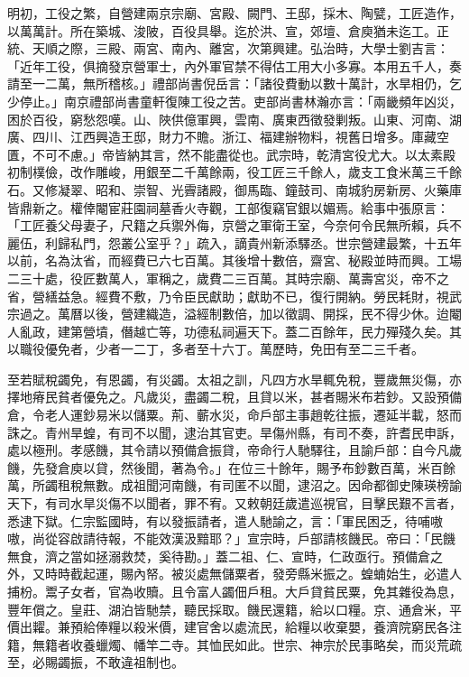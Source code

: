 明初，工役之繁，自營建兩京宗廟、宮殿、闕門、王邸，採木、陶甓，工匠造作，以萬萬計。所在築城、浚陂，百役具舉。迄於洪、宣，郊壇、倉庾猶未迄工。正統、天順之際，三殿、兩宮、南內、離宮，次第興建。弘治時，大學士劉吉言：「近年工役，俱摘發京營軍士，內外軍官禁不得估工用大小多寡。本用五千人，奏請至一二萬，無所稽核。」禮部尚書倪岳言：「諸役費動以數十萬計，水旱相仍，乞少停止。」南京禮部尚書童軒復陳工役之苦。吏部尚書林瀚亦言：「兩畿頻年凶災，困於百役，窮愁怨嘆。山、陜供億軍興，雲南、廣東西徵發剿叛。山東、河南、湖廣、四川、江西興造王邸，財力不贍。浙江、福建辦物料，視舊日增多。庫藏空匱，不可不慮。」帝皆納其言，然不能盡從也。武宗時，乾清宮役尤大。以太素殿初制樸儉，改作雕峻，用銀至二千萬餘兩，役工匠三千餘人，歲支工食米萬三千餘石。又修凝翠、昭和、崇智、光霽諸殿，御馬臨、鐘鼓司、南城豹房新房、火藥庫皆鼎新之。權倖閹宦莊園祠墓香火寺觀，工部復竊官銀以媚焉。給事中張原言：「工匠養父母妻子，尺籍之兵禦外侮，京營之軍衛王室，今奈何令民無所賴，兵不麗伍，利歸私門，怨叢公室乎？」疏入，謫貴州新添驛丞。世宗營建最繁，十五年以前，名為汰省，而經費已六七百萬。其後增十數倍，齋宮、秘殿並時而興。工場二三十處，役匠數萬人，軍稱之，歲費二三百萬。其時宗廟、萬壽宮災，帝不之省，營繕益急。經費不敷，乃令臣民獻助；獻助不已，復行開納。勞民耗財，視武宗過之。萬曆以後，營建織造，溢經制數倍，加以徵調、開採，民不得少休。迨閹人亂政，建第營墳，僭越亡等，功德私祠遍天下。蓋二百餘年，民力殫殘久矣。其以職役優免者，少者一二丁，多者至十六丁。萬歷時，免田有至二三千者。

至若賦稅蠲免，有恩蠲，有災蠲。太祖之訓，凡四方水旱輒免稅，豐歲無災傷，亦擇地瘠民貧者優免之。凡歲災，盡蠲二稅，且貸以米，甚者賜米布若鈔。又設預備倉，令老人運鈔易米以儲粟。荊、蘄水災，命戶部主事趙乾往振，遷延半載，怒而誅之。青州旱蝗，有司不以聞，逮治其官吏。旱傷州縣，有司不奏，許耆民申訴，處以極刑。孝感饑，其令請以預備倉振貸，帝命行人馳驛往，且諭戶部：自今凡歲饑，先發倉庾以貸，然後聞，著為令。」在位三十餘年，賜予布鈔數百萬，米百餘萬，所蠲租稅無數。成祖聞河南饑，有司匿不以聞，逮沼之。因命都御史陳瑛榜諭天下，有司水旱災傷不以聞者，罪不宥。又敕朝廷歲遣巡視官，目擊民艱不言者，悉逮下獄。仁宗監國時，有以發振請者，遣人馳諭之，言：「軍民困乏，待哺嗷嗷，尚從容啟請待報，不能效漢汲黯耶？」宣宗時，戶部請核饑民。帝曰：「民饑無食，濟之當如拯溺救焚，奚待勘。」蓋二祖、仁、宣時，仁政亟行。預備倉之外，又時時截起運，賜內帑。被災處無儲粟者，發旁縣米振之。蝗蝻始生，必遣人捕枌。鬻子女者，官為收贖。且令富人蠲佃戶租。大戶貸貧民粟，免其雜役為息，豐年償之。皇莊、湖泊皆馳禁，聽民採取。饑民還籍，給以口糧。京、通倉米，平價出糶。兼預給俸糧以殺米價，建官舍以處流民，給糧以收棄嬰，養濟院窮民各注籍，無籍者收養蠟燭、幡竿二寺。其恤民如此。世宗、神宗於民事略矣，而災荒疏至，必賜蠲振，不敢違祖制也。

